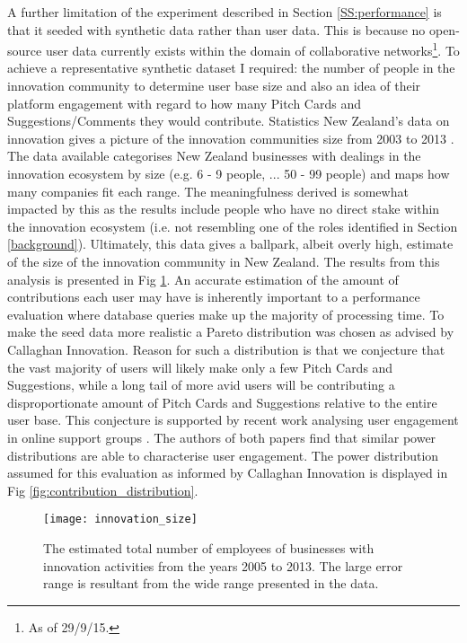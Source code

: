 A further limitation of the experiment described in Section \ref{SS:performance} is that it seeded with synthetic data rather than user data. This is because no open-source user data currently exists within the domain of collaborative networks\footnote{As of 29/9/15.}. To achieve a representative synthetic dataset I required: the number of people in the innovation community to determine user base size and also an idea of their platform engagement with regard to how many Pitch Cards and Suggestions/Comments they would contribute. Statistics New Zealand's data on innovation gives a picture of the innovation communities size from 2003 to 2013 \cite{Innov5:online}\cite{Innov7:online}\cite{Innov9:online}\cite{Innov11:online}\cite{Innov13:online}. 
The data available categorises New Zealand businesses with dealings in the innovation ecosystem by size (e.g. 6 - 9 people, ... 50 - 99 people) and maps how many companies fit each range. The meaningfulness derived is somewhat impacted by this as the results include people who have no direct stake within the innovation ecosystem (i.e. not resembling one of the roles identified in Section \ref{background}). Ultimately, this data gives a ballpark, albeit overly high, estimate of the size of the innovation community in New Zealand. The results from this analysis is presented in Fig \ref{fig:innovation_size}.
An accurate estimation of the amount of contributions each user may have is inherently important to a performance evaluation where database queries make up the majority of processing time. To make the seed data more realistic a Pareto distribution was chosen as advised by Callaghan Innovation. Reason for such a distribution is that we conjecture that the vast majority of users will likely make only a few Pitch Cards and Suggestions, while a long tail of more avid users will be contributing a disproportionate amount of Pitch Cards and Suggestions relative to the entire user base. This conjecture is supported by recent work analysing user engagement in online support groups \cite{carron2014describing}\cite{van2015mapping}. The authors of both papers find that similar power distributions are able to characterise user engagement. The power distribution assumed for this evaluation as informed by Callaghan Innovation is displayed in Fig \ref{fig:contribution_distribution}.

\begin{figure}[ht]
    \centering
    \texttt{[image: innovation\_size]}
    \caption{The estimated total number of employees of businesses with innovation activities from the years 2005 to 2013. The large error range is resultant from the wide range presented in the data.}
    \label{fig:innovation_size}
\end{figure}

